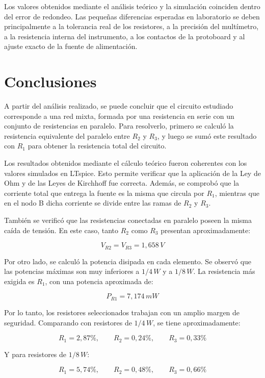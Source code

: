 \documentclass[a4paper,12pt]{article}
\begin{document}
	Los valores obtenidos mediante el análisis teórico y la simulación coinciden dentro del error de
	redondeo. Las pequeñas diferencias esperadas en laboratorio se deben principalmente a la tolerancia
	real de los resistores, a la precisión del multímetro, a la resistencia interna del instrumento, a los
	contactos de la protoboard y al ajuste exacto de la fuente de alimentación.
	
	
	\section*{Conclusiones}		
	
	
	A partir del análisis realizado, se puede concluir que el circuito estudiado corresponde a una red
	mixta, formada por una resistencia en serie con un conjunto de resistencias en paralelo. Para resolverlo,
	primero se calculó la resistencia equivalente del paralelo entre $R_2$ y $R_3$, y luego se sumó este
	resultado con $R_1$ para obtener la resistencia total del circuito.
	
	Los resultados obtenidos mediante el cálculo teórico fueron coherentes con los valores simulados en
	LTspice. Esto permite verificar que la aplicación de la Ley de Ohm y de las Leyes de Kirchhoff fue
	correcta. Además, se comprobó que la corriente total que entrega la fuente es la misma que circula por
	$R_1$, mientras que en el nodo B dicha corriente se divide entre las ramas de $R_2$ y $R_3$.
	
	También se verificó que las resistencias conectadas en paralelo poseen la misma caída de tensión. En
	este caso, tanto $R_2$ como $R_3$ presentan aproximadamente:
	
	\[
	V_{R2} = V_{R3} = 1,658\,V
	\]
	
	Por otro lado, se calculó la potencia disipada en cada elemento. Se observó que las potencias máximas
	son muy inferiores a $1/4\,W$ y a $1/8\,W$. La resistencia más exigida es $R_1$, con una potencia
	aproximada de:
	
	\[
	P_{R1} = 7,174\,mW
	\]
	
	Por lo tanto, los resistores seleccionados trabajan con un amplio margen de seguridad. Comparando
	con resistores de $1/4\,W$, se tiene aproximadamente:
	
	\[
	R_1 = 2,87\%, \qquad R_2 = 0,24\%, \qquad R_3 = 0,33\%
	\]
	
	Y para resistores de $1/8\,W$:
	
	\[
	R_1 = 5,74\%, \qquad R_2 = 0,48\%, \qquad R_3 = 0,66\%
	\]
	
\end{document}

